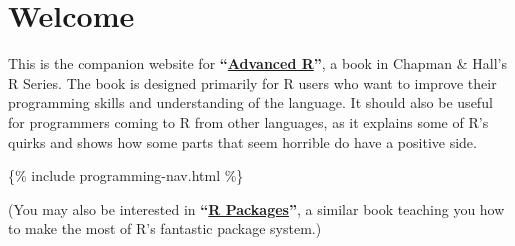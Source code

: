 \chapter{Welcome}

This is the companion website for
\textbf{``\href{http://amzn.com/1466586966?tag=devtools-20}{Advanced
R}''}, a book in Chapman \& Hall's R Series. The book is designed
primarily for R users who want to improve their programming skills and
understanding of the language. It should also be useful for programmers
coming to R from other languages, as it explains some of R's quirks and
shows how some parts that seem horrible do have a positive side.

\{\% include programming-nav.html \%\}

(You may also be interested in
\textbf{``\href{http://r-pkgs.had.co.nz/}{R Packages}''}, a similar book
teaching you how to make the most of R's fantastic package system.)

